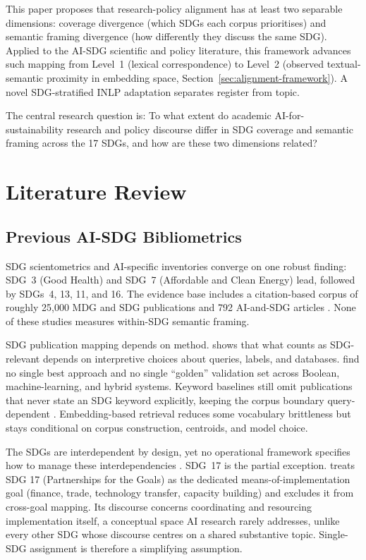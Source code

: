 \documentclass[12pt,a4paper]{article}
\let\OldSection\section
\renewcommand{\section}{\clearpage\FloatBarrier\OldSection}
\begin{document}
This paper proposes that research-policy alignment has at least two separable dimensions: coverage divergence (which SDGs each corpus prioritises) and semantic framing divergence (how differently they discuss the same SDG). Applied to the AI-SDG scientific and policy literature, this framework advances such mapping from Level~1 (lexical correspondence) to Level~2 (observed textual-semantic proximity in embedding space, Section~\ref{sec:alignment-framework}). A novel SDG-stratified INLP adaptation separates register from topic.

The central research question is: To what extent do academic AI-for-sustainability research and policy discourse differ in SDG coverage and semantic framing across the 17 SDGs, and how are these two dimensions related?

\section{Literature Review}
\label{sec:litreview}

\subsection{Previous AI-SDG Bibliometrics}\label{sec:prev-biblio}

SDG scientometrics and AI-specific inventories \parencite{Vinuesa2020} converge on one robust finding: SDG~3 (Good Health) and SDG~7 (Affordable and Clean Energy) lead, followed by SDGs~4, 13, 11, and 16. The evidence base includes a citation-based corpus of roughly 25,000 MDG and SDG publications \parencite{BautistaPuig2021} and 792 AI-and-SDG articles \parencite{Gohr2025AiSdgs}. None of these studies measures within-SDG semantic framing.

SDG publication mapping depends on method. \textcite{Armitage2020} shows that what counts as SDG-relevant depends on interpretive choices about queries, labels, and databases. \textcite{Kashnitsky2024} find no single best approach and no single ``golden'' validation set across Boolean, machine-learning, and hybrid systems. Keyword baselines still omit publications that never state an SDG keyword explicitly, keeping the corpus boundary query-dependent \parencite{Yin2025SdgMapping}. Embedding-based retrieval reduces some vocabulary brittleness but stays conditional on corpus construction, centroids, and model choice.

The SDGs are interdependent by design, yet no operational framework specifies how to manage these interdependencies \parencite{Nilsson2016}. SDG~17 is the partial exception. \textcite{LeBlanc2015} treats SDG 17 (Partnerships for the Goals) as the dedicated means-of-implementation goal (finance, trade, technology transfer, capacity building) and excludes it from cross-goal mapping. Its discourse concerns coordinating and resourcing implementation itself, a conceptual space AI research rarely addresses, unlike every other SDG whose discourse centres on a shared substantive topic. Single-SDG assignment is therefore a simplifying assumption.
\end{document}
